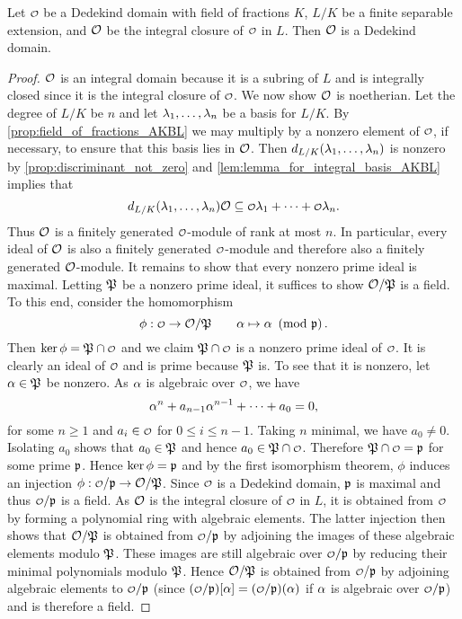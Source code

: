     \begin{proposition}\label{prop:integral_closure_of_Dedekind_is_Dedekind}
      Let $\smc{O}$ be a Dedekind domain with field of fractions $K$, $L/K$ be a finite separable extension, and $\mathcal{O}$ be the integral closure of $\smc{O}$ in $L$. Then $\mathcal{O}$ is a Dedekind domain.
    \end{proposition}
    \begin{proof}
      $\mathcal{O}$ is an integral domain because it is a subring of $L$ and is integrally closed since it is the integral closure of $\smc{O}$. We now show $\mathcal{O}$ is noetherian. Let the degree of $L/K$ be $n$ and let $\lambda_{1},\ldots,\lambda_{n}$ be a basis for $L/K$. By \cref{prop:field_of_fractions_AKBL} we may multiply by a nonzero element of $\smc{O}$, if necessary, to ensure that this basis lies in $\mathcal{O}$. Then $d_{L/K}(\lambda_{1},\ldots,\lambda_{n})$ is nonzero by \cref{prop:discriminant_not_zero} and \cref{lem:lemma_for_integral_basis_AKBL} implies that
      \[
        d_{L/K}(\l_{1},\ldots,\l_{n})\mc{O} \subseteq \smc{O}\l_{1}+\cdots+\smc{O}\l_{n}.
      \]
      Thus $\mathcal{O}$ is a finitely generated $\smc{O}$-module of rank at most $n$. In particular, every ideal of $\mathcal{O}$ is also a finitely generated $\smc{O}$-module and therefore also a finitely generated $\mathcal{O}$-module. It remains to show that every nonzero prime ideal is maximal. Letting $\mathfrak{P}$ be a nonzero prime ideal, it suffices to show $\mathcal{O}/\mathfrak{P}$ is a field. To this end, consider the homomorphism
      \[
        \phi:\smc{O} \to \mc{O}/\mf{P} \qquad \a \mapsto \a \tmod{\mf{p}}.
      \]
      Then $\ker\phi = \mf{P} \cap \smc{O}$ and we claim $\mf{P} \cap \smc{O}$ is a nonzero prime ideal of $\smc{O}$. It is clearly an ideal of $\smc{O}$ and is prime because $\mathfrak{P}$ is. To see that it is nonzero, let $\alpha \in \mathfrak{P}$ be nonzero. As $\alpha$ is algebraic over $\smc{O}$, we have
      \[
        \alpha^{n}+a_{n-1}\alpha^{n-1}+\cdots+a_{0} = 0,
      \]
      for some $n \ge 1$ and $a_{i} \in \smc{O}$ for $0 \le i \le n-1$. Taking $n$ minimal, we have $a_{0} \neq 0$. Isolating $a_{0}$ shows that $a_{0} \in \mathfrak{P}$ and hence $a_{0} \in \mf{P} \cap \smc{O}$. Therefore $\mf{P} \cap \smc{O} = \mf{p}$ for some prime $\mathfrak{p}$. Hence $\ker\phi = \mathfrak{p}$ and by the first isomorphism theorem, $\phi$ induces an injection $\phi:\smc{O}/\mf{p} \to \mc{O}/\mf{P}$. Since $\smc{O}$ is a Dedekind domain, $\mathfrak{p}$ is maximal and thus $\smc{O}/\mf{p}$ is a field. As $\mathcal{O}$ is the integral closure of $\smc{O}$ in $L$, it is obtained from $\smc{O}$ by forming a polynomial ring with algebraic elements. The latter injection then shows that $\mathcal{O}/\mathfrak{P}$ is obtained from $\smc{O}/\mf{p}$ by adjoining the images of these algebraic elements modulo $\mathfrak{P}$. These images are still algebraic over $\smc{O}/\mf{p}$ by reducing their minimal polynomials modulo $\mathfrak{P}$. Hence $\mathcal{O}/\mathfrak{P}$ is obtained from $\smc{O}/\mf{p}$ by adjoining algebraic elements to $\smc{O}/\mf{p}$ (since $(\smc{O}/\mf{p})[\a] = (\smc{O}/\mf{p})(\a)$ if $\alpha$ is algebraic over $\smc{O}/\mf{p}$) and is therefore a field.
    \end{proof}

